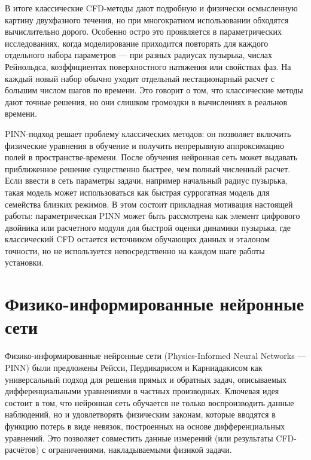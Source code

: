 В итоге классические CFD-методы дают подробную и физически осмысленную картину
двухфазного течения, но при многократном использовании обходятся
вычислительно дорого. Особенно остро это проявляется в параметрических
исследованиях, когда моделирование приходится повторять для каждого отдельного
набора параметров --- при разных радиусах пузырька, числах Рейнольдса,
коэффициентах поверхностного натяжения или свойствах фаз. На каждый новый набор
обычно уходит отдельный нестационарный расчет с большим числом шагов по
времени. Это говорит о том, что классические методы дают точные решения, но они слишком громоздки в вычислениях в реальнов времени.

PINN-подход решает проблему классических методов:
он позволяет включить физические
уравнения в обучение и получить непрерывную аппроксимацию полей в
пространстве-времени. После обучения нейронная сеть может выдавать приближенное
решение существенно быстрее, чем полный численный расчет. Если ввести в сеть
параметры задачи, например начальный радиус пузырька, такая модель может
использоваться как быстрая суррогатная модель для семейства близких режимов. В
этом состоит прикладная мотивация настоящей работы: параметрическая PINN может
быть рассмотрена как элемент цифрового двойника или расчетного модуля для
быстрой оценки динамики пузырька, где классический CFD остается источником
обучающих данных и эталоном точности, но не используется непосредственно на
каждом шаге работы установки.

\section{Физико-информированные нейронные сети}

Физико-информированные нейронные сети (Physics-Informed Neural Networks --- PINN)
были предложены Рейсси, Пердикарисом и Карниадакисом \cite{Raissi2019} как
универсальный подход для решения прямых и обратных задач, описываемых
дифференциальными уравнениями в частных производных. Ключевая идея состоит в
том, что нейронная сеть обучается не только воспроизводить данные наблюдений,
но и удовлетворять физическим законам, которые вводятся в функцию потерь в виде
невязок, построенных на основе дифференциальных уравнений. Это позволяет совместить данные измерений
(или результаты CFD-расчётов) с ограничениями, накладываемыми физикой задачи.

